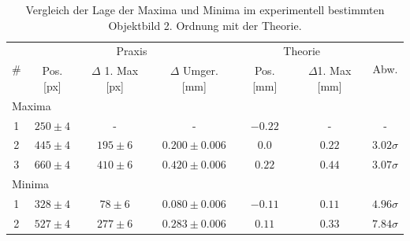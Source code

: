 \begin{table}[H]
  \centering
  \caption{Vergleich der Lage der Maxima und Minima im experimentell bestimmten Objektbild 2. Ordnung mit der Theorie.}
  \vspace*{0.5em}
  \begin{tabular}{|c|c|c|c|c|c|c|}\hline
    \multirow{2}{*}{\#} & \multicolumn{3}{c|}{Praxis} & \multicolumn{2}{c|}{Theorie} & \multirow{2}{*}{Abw.}\\\cline{2-6}
        & Pos. [px] & $\Delta$ 1. Max [px] & $\Delta$ Umger. [mm] & Pos. [mm] & $\Delta$1. Max [mm] & \\\hline
    \multicolumn{7}{|l|}{Maxima}\\\hline
    1   & $250 \pm 4$ & -                 & -             & $-0.22$ & -                 & - \\
    2   & $445 \pm 4$ & $195 \pm 6$ & $0.200 \pm 0.006$ & $0.0$ & $0.22$ & $3.02\sigma$\\
    3   & $660 \pm 4$ & $410 \pm 6$ & $0.420 \pm 0.006$ & $0.22$ & $0.44$ & $3.07\sigma$\\\hline
    \multicolumn{7}{|l|}{Minima}\\\hline
    1   & $328 \pm 4$ & $78 \pm 6$ & $0.080 \pm 0.006$ & $-0.11$ & $0.11$ & $4.96\sigma$\\
    2   & $527 \pm 4$ & $277 \pm 6$ & $0.283 \pm 0.006$ & $0.11$ & $0.33$ & $7.84\sigma$\\\hline
  \end{tabular}
  \label{tab:vergl_objbild_ma_mi_x_ord2}
\end{table}
